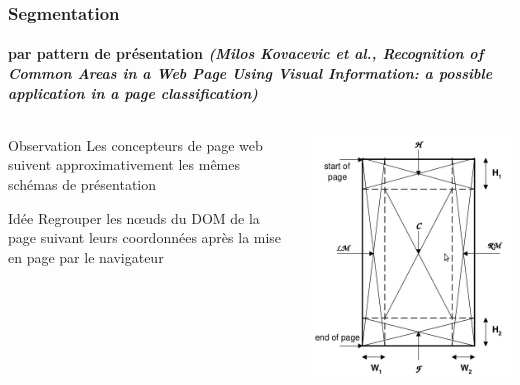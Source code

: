 \documentclass[]{beamer}
\begin{document}
\begin{frame}
\frametitle{Segmentation}
\framesubtitle{par pattern de présentation \textit{(Milos Kovacevic et al., Recognition of Common Areas in a Web Page Using Visual Information: a possible application in a page classification)}}
\begin{columns}
	\begin{column}{5cm}
	\begin{block}{Observation}
		Les concepteurs de page web suivent approximativement les mêmes schémas de présentation
	\end{block}
	\begin{block}{Idée}
		Regrouper les n\oe{}uds du DOM de la page suivant leurs coordonnées après la mise en page par le navigateur
	\end{block}
	\end{column}
	\begin{column}{5cm}
		\includegraphics[scale=0.3]{img/segmentation-pattern.jpg}
	\end{column}
\end{columns}
\end{frame}
\end{document}
